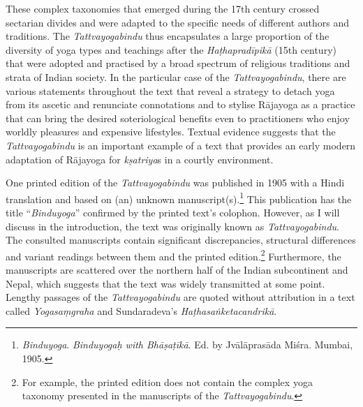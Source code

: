 These complex taxonomies that emerged during the 17th century crossed sectarian divides and were adapted to the specific needs of different authors and traditions. The \textit{Tattvayogabindu} thus encapsulates a large proportion of the diversity of yoga types and teachings after the \textit{Haṭhapradīpikā} (15th century) that were adopted and practised by a broad spectrum of religious traditions and strata of Indian society. In the particular case of the \textit{Tattvayogabindu}, there are various statements throughout the text that reveal a strategy to detach yoga from its ascetic and renunciate connotations and to stylise Rājayoga as a practice that can bring the desired soteriological benefits even to practitioners who enjoy worldly pleasures and expensive lifestyles. Textual evidence suggests that the \textit{Tattvayogabindu} is an important example of a text that provides an early modern adaptation of Rājayoga for \textit{kṣatriya}s in a courtly environment.

One printed edition of the \textit{Tattvayogabindu} was published in 1905 with a Hindi translation and based on (an) unknown manuscript(s).\footnote{\emph{Binduyoga}. \textit{Binduyogaḥ with Bhāṣaṭīkā}. Ed. by Jvālāprasāda Miśra. Mumbai, 1905.} This publication has the title ``\textit{Binduyoga}'' confirmed by the printed text’s colophon. However, as I will discuss in the introduction, the text was originally known as \textit{Tattvayogabindu}. The consulted manuscripts contain significant discrepancies, structural differences and variant readings between them and the printed edition.\footnote{For example, the printed edition does not contain the complex yoga taxonomy presented in the manuscripts of the \emph{Tattvayogabindu}.} Furthermore, the manuscripts are scattered over the northern half of the Indian subcontinent and Nepal, which suggests that the text was widely transmitted at some point. Lengthy passages of the \textit{Tattvayogabindu} are quoted without attribution in a text called \textit{Yogasaṃgraha} and Sundaradeva’s \textit{Haṭhasaṅketacandrikā}.

